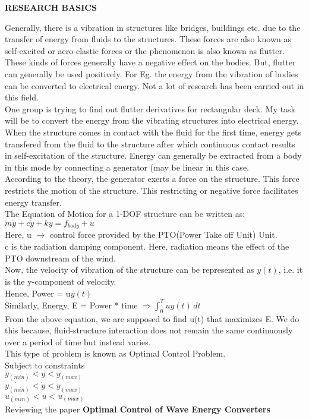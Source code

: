 \documentclass{article}
\begin{document}
\begin{center}

{\bf RESEARCH BASICS}

\end{center} 

Generally, there is a vibration in structures like bridges, buildings etc. due to the transfer of energy from fluids to the structures. These forces are also known as self-excited or aero-elastic forces or the phenomenon is also known as flutter.\\
These kinds of forces generally have a negative effect on the bodies. But, flutter can generally be used positively. For Eg. the energy from the vibration of bodies can be converted to electrical energy. Not a lot of research has been carried out in this field.\\
One group is trying to find out flutter derivatives for rectangular deck. My task will be to convert the energy from the vibrating structures into electrical energy.\\
When the structure comes in contact with the fluid for the first time, energy gets transfered from the fluid to the structure after which continuous contact results in self-excitation of the structure. Energy can generally be extracted from a body in this mode by connecting a generator (may be linear in this case.\\
According to the theory, the generator exerts a force on the structure. This force restricts the motion of the structure. This restricting or negative force facilitates energy transfer.\\
The Equation of Motion for a 1-DOF structure can be written as:\\
$m\ddot{y} + c\dot{y} + ky = f_{body} + u$\\
Here, u $\rightarrow$ control force provided by the PTO(Power Take off Unit) Unit.\\
c is the radiation damping component. Here, radiation means the effect of the PTO downstream of the wind.\\

Now, the velocity of vibration of the structure can be represented as $\dot{y(t)}$, i.e. it is the y-component of velocity.\\
Hence, Power = u$\dot{y(t)}$\\
Similarly, Energy, E = Power * time $\Rightarrow \int^T_0u\dot{y(t)}\,dt$\\
From the above equation, we are supposed to find u(t) that maximizes E. We do this because, fluid-structure interaction does not remain the same continuously over a period of time but instead varies.\\
This type of problem is known as Optimal Control Problem.\\
Subject to constraints\\
$y_(min) < y < y_(max)$\\  
$\dot{y_(min)} < \dot{y} < \dot{y_(max)}$\\
$u_(min) < u < u_(max)$\\


Reviewing the paper {\bf Optimal Control of Wave Energy Converters}\\
\end{document}
